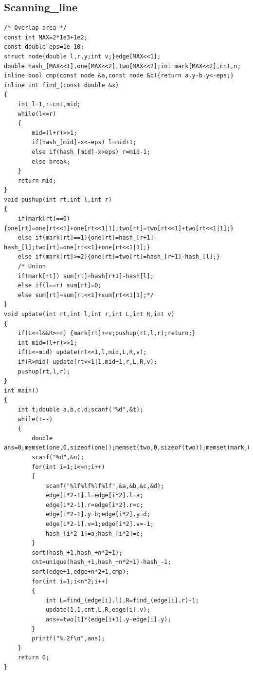 \documentclass[twoside]{article}
\begin{document}
\subsection{Scanning_line}
\begin{lstlisting}
/* Overlap area */
const int MAX=2*1e3+1e2;
const double eps=1e-10;
struct node{double l,r,y;int v;}edge[MAX<<1];
double hash_[MAX<<1],one[MAX<<2],two[MAX<<2];int mark[MAX<<2],cnt,n;
inline bool cmp(const node &a,const node &b){return a.y-b.y<-eps;}
inline int find_(const double &x)
{
    int l=1,r=cnt,mid;
    while(l<=r)
    {
        mid=(l+r)>>1;
        if(hash_[mid]-x<-eps) l=mid+1;
        else if(hash_[mid]-x>eps) r=mid-1;
        else break;
    }
    return mid;
}
void pushup(int rt,int l,int r)
{
    if(mark[rt]==0){one[rt]=one[rt<<1]+one[rt<<1|1];two[rt]=two[rt<<1]+two[rt<<1|1];}
    else if(mark[rt]==1){one[rt]=hash_[r+1]-hash_[l];two[rt]=one[rt<<1]+one[rt<<1|1];}
    else if(mark[rt]>=2){one[rt]=two[rt]=hash_[r+1]-hash_[l];}
    /* Union
    if(mark[rt]) sum[rt]=hash[r+1]-hash[l];
    else if(l==r) sum[rt]=0;
    else sum[rt]=sum[rt<<1]+sum[rt<<1|1];*/
}
void update(int rt,int l,int r,int L,int R,int v)
{
    if(L<=l&&R>=r) {mark[rt]+=v;pushup(rt,l,r);return;}
    int mid=(l+r)>>1;
    if(L<=mid) update(rt<<1,l,mid,L,R,v);
    if(R>mid) update(rt<<1|1,mid+1,r,L,R,v);
    pushup(rt,l,r);
}
int main()
{
    int t;double a,b,c,d;scanf("%d",&t);
    while(t--)
    {
        double ans=0;memset(one,0,sizeof(one));memset(two,0,sizeof(two));memset(mark,0,sizeof(mark));
        scanf("%d",&n);
        for(int i=1;i<=n;i++)
        {
            scanf("%lf%lf%lf%lf",&a,&b,&c,&d);
            edge[i*2-1].l=edge[i*2].l=a;
            edge[i*2-1].r=edge[i*2].r=c;
            edge[i*2-1].y=b;edge[i*2].y=d;
            edge[i*2-1].v=1;edge[i*2].v=-1;
            hash_[i*2-1]=a;hash_[i*2]=c;
        }
        sort(hash_+1,hash_+n*2+1);
        cnt=unique(hash_+1,hash_+n*2+1)-hash_-1;
        sort(edge+1,edge+n*2+1,cmp);
        for(int i=1;i<n*2;i++)
        {
            int L=find_(edge[i].l),R=find_(edge[i].r)-1;
            update(1,1,cnt,L,R,edge[i].v);
            ans+=two[1]*(edge[i+1].y-edge[i].y);
        }
        printf("%.2f\n",ans);
    }
    return 0;
}
\end{lstlisting}
\end{document}
